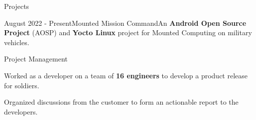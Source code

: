 \documentclass{article}
\newlength{\tabin}
\newlength{\secsep}
\newcommand{\lineunder}{\vspace*{-8pt} \\ \hspace*{-6pt} \hrulefill \\ \vspace*{-15pt}}
\newenvironment{tabbedsection}[1]{
	\begin{list}{}{
			\setlength{\itemsep}{0pt}
			\setlength{\labelsep}{0pt}
			\setlength{\labelwidth}{0pt}
			\setlength{\leftmargin}{0pt}
			\setlength{\rightmargin}{\tabin}
			\setlength{\listparindent}{0pt}
			\setlength{\parsep}{0pt}
			\setlength{\parskip}{0pt}
			\setlength{\partopsep}{0pt}
			\setlength{\topsep}{#1}
		}
		\item[]
	}{\end{list}}
\newenvironment{resume_section}[1]{
	\filbreak
	\vspace{2\secsep}
	\textsc{\color{blue}\large#1}
	\lineunder
	\begin{tabbedsection}{\secsep}
	}{\end{tabbedsection}}
\newenvironment{resume_project_subsection}[3]{
	\textbf{\color{BlueViolet}#2} \hfill \hspace{-5em} {\normalsize (#1)}
	\\ {\small \textit{ #3}}
	\begin{tabbedsection}{0.5\secsep}
		\begin{subitems}
		}{\end{subitems}\end{tabbedsection}}
\newenvironment{subitems}{
	\renewcommand{\labelitemi}{-}
	\begin{itemize}
		\setlength{\labelsep}{1em}
	}{\end{itemize}}
\newenvironment{resume_skill_group}[1]{
	\hspace{-18pt}\textbf{#1}
	\begin{itemize}
	}{\end{itemize}}
\begin{document}
	\begin{resume_section}{Projects}
		\begin{resume_project_subsection}{August 2022 - Present}{Mounted Mission Command}{An \textbf{Android Open Source Project} (AOSP) and \textbf{Yocto Linux} project for Mounted Computing on military vehicles.}
			\begin{resume_skill_group}{Project Management}
				\item 
				\item 
				Worked as a developer on a team of \textbf{16 engineers} to develop a product release for soldiers. 
				\item 
				Organized discussions from the customer to form an actionable report to the developers.
				\iffalse
				\item 
				Formed most of the team’s documentation for testing, building, and development environments to support our team of developers that has doubled in size. 
				
				\fi
			\end{resume_skill_group}
			

\end{resume_project_subsection}
\end{resume_section}
\end{document}

